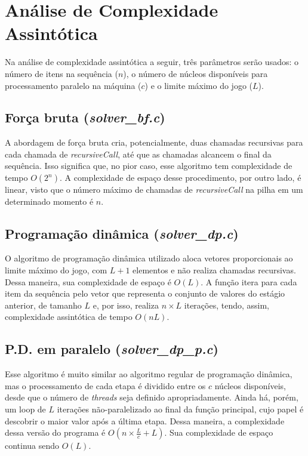 \documentclass[10pt,a4paper]{article}
\numberwithin{equation}{section}
\begin{document}
\section{Análise de Complexidade Assintótica}

Na análise de complexidade assintótica a seguir, três parâmetros serão usados: o número de itens na sequência ($n$), o número de núcleos disponíveis para processamento paralelo na máquina ($c$) e o limite máximo do jogo ($L$).

\subsection{Força bruta (\emph{solver\_bf.c})}

A abordagem de força bruta cria, potencialmente, duas chamadas recursivas para cada chamada de \emph{recursiveCall}, até que as chamadas alcancem o final da sequência. Isso significa que, no pior caso, esse algoritmo tem complexidade de tempo $O(2^n)$. A complexidade de espaço desse procedimento, por outro lado, é linear, visto que o número máximo de chamadas de \emph{recursiveCall} na pilha em um determinado momento é $n$.

\subsection{Programação dinâmica (\emph{solver\_dp.c})}

O algoritmo de programação dinâmica utilizado aloca vetores proporcionais ao limite máximo do jogo, com $L + 1$ elementos e não realiza chamadas recursivas. Dessa maneira, sua complexidade de espaço é $O(L)$. A função itera para cada item da sequência pelo vetor que representa o conjunto de valores do estágio anterior, de tamanho $L$ e, por isso, realiza $n \times L$ iterações, tendo, assim, complexidade assintótica de tempo $O(nL)$.

\subsection{P.D. em paralelo (\emph{solver\_dp\_p.c})}

Esse algoritmo é muito similar ao algoritmo regular de programação dinâmica, mas o processamento de cada etapa é dividido entre os $c$ núcleos disponíveis, desde que o número de \emph{threads} seja definido apropriadamente. Ainda há, porém, um loop de $L$ iterações não-paralelizado ao final da função principal, cujo papel é descobrir o maior valor após a última etapa. Dessa maneira, a complexidade dessa versão do programa é $O(n \times \frac{L}{c} + L)$. Sua complexidade de espaço continua sendo $O(L)$.
\end{document}
